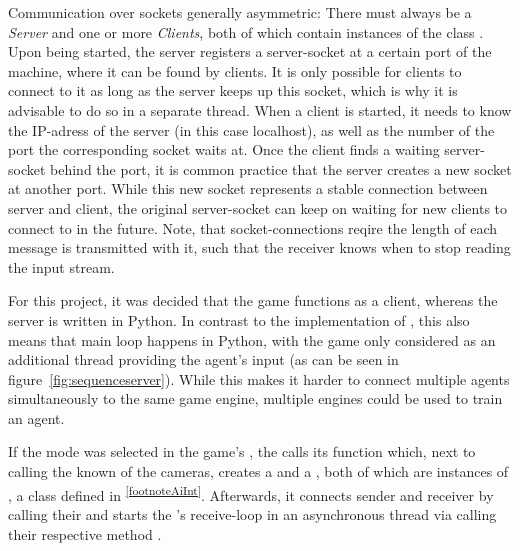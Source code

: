 Communication over sockets generally asymmetric: There must always be a \textit{Server} and one or more \textit{Clients}, both of which contain instances of the class . Upon being started, the server registers a server-socket at a certain port of the machine, where it can be found by clients. It is only possible for clients to connect to it as long as the server keeps up this socket, which is why it is advisable to do so in a separate thread. When a client is started, it needs to know the IP-adress of the server (in this case localhost), as well as the number of the port the corresponding socket waits at. Once the client finds a waiting server-socket behind the port, it is common practice that the server creates a new socket at another port. While this new socket represents a stable connection between server and client, the original server-socket can keep on waiting for new clients to connect to in the future. Note, that socket-connections reqire the length of each message is transmitted with it, such that the receiver knows when to stop reading the input stream.


For this project, it was decided that the game functions as a client, whereas the server is written in Python. In contrast to the implementation of \cite{loiacono_simulated_2013}, this also means that main loop happens in Python, with the game only considered as an additional thread providing the agent's input (as can be seen in figure~\ref{fig:sequenceserver}). While this makes it harder to connect multiple agents simultaneously to the same game engine, multiple engines could be used to train an agent.

\noindent If the  mode was selected in the game's , the  calls its function  which, next to calling the known  of the cameras, creates a  and a , both of which are instances of , a class defined in \textsuperscript{\ref{footnoteAiInt}}. Afterwards, it connects sender and receiver by calling their  and starts the 's receive-loop in an asynchronous thread via calling their respective method . 

